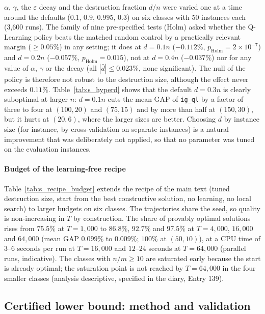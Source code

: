 \documentclass[final,3p,times,11pt,authoryear]{elsarticle}
\begin{document}
$\alpha$, $\gamma$, the $\varepsilon$ decay and the destruction fraction
$d/n$ were varied one at a time around the defaults ($0.1$, $0.9$, $0.995$,
$0.3$) on six classes with 50 instances each (3{,}600 runs). The family of
nine pre-specified tests (Holm) asked whether the Q-Learning policy beats
the matched random control by a practically relevant margin
($\geq0.05\%$) in any setting; it does at $d=0.1n$ ($-0.112\%$,
$p_{\mathrm{Holm}}=2\times10^{-7}$) and $d=0.2n$ ($-0.057\%$,
$p_{\mathrm{Holm}}=0.015$), not at $d=0.4n$ ($-0.037\%$) nor for any value of
$\alpha$, $\gamma$ or the decay (all $|\bar d|\leq0.023\%$, none
significant). The null of the policy is therefore not robust to the
destruction size, although the effect never exceeds $0.11\%$.
Table~\ref{tab:s_hyperd} shows that the default $d=0.3n$ is clearly
suboptimal at larger $n$: $d=0.1n$ cuts the mean GAP of \texttt{ig\_ql}
by a factor of three to four at $(100,20)$ and $(75,15)$ and by more than half at
$(150,30)$, but it hurts at $(20,6)$, where the larger sizes are better. Choosing $d$ by instance size (for instance, by cross-validation on
separate instances) is a natural improvement that was deliberately not
applied, so that no parameter was tuned on the evaluation instances.



\paragraph{Budget of the learning-free recipe}
Table~\ref{tab:s_recipe_budget} extends the recipe of the main text (tuned destruction size, start from the best constructive solution, no learning, no local search) to larger budgets on six classes. The trajectories share the seed, so quality is non-increasing in $T$ by construction. The share of provably optimal solutions rises from $75.5\%$ at $T=1{,}000$ to $86.8\%$, $92.7\%$ and $97.5\%$ at $T=4{,}000$, $16{,}000$ and $64{,}000$ (mean GAP $0.099\%$ to $0.009\%$; $100\%$ at $(50,10)$), at a CPU time of $3$--$6$ seconds per run at $T=16{,}000$ and $12$--$24$ seconds at $T=64{,}000$ (parallel runs, indicative). The classes with $n/m\geq10$ are saturated early because the start is already optimal; the saturation point is not reached by $T=64{,}000$ in the four smaller classes (analysis descriptive, specified in the diary, Entry 139).


\subsection{Certified lower bound: method and validation}
\label{sec:lbaf}
\end{document}
